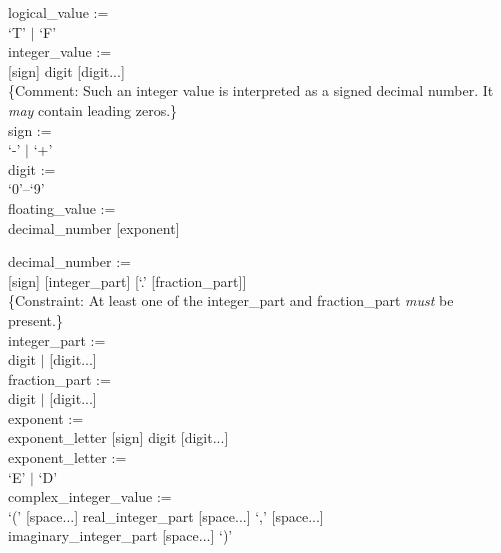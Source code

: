 \documentclass[onecolumn]{aa}
\begin{document}
logical\_value :=   \\ \null \hspace{0.5in}
	`T' $|$ `F' \\

integer\_value :=   \\ \null \hspace{0.5in}
	[sign] digit [digit...] \\
\{Comment: Such an integer value is interpreted as a signed decimal
number.  It {\em may} contain leading zeros.\} \\

sign :=   \\ \null \hspace{0.5in}
	`-' $|$ `+' \\

digit :=   \\ \null \hspace{0.5in}
	`0'--`9' \\

floating\_value :=   \\ \null \hspace{0.5in}
	decimal\_number [exponent]

decimal\_number :=   \\ \null \hspace{0.5in}
	[sign] [integer\_part] [`.' [fraction\_part]]  \\
\{Constraint: At least one of the integer\_part and fraction\_part {\em must} be
present.\} \\

integer\_part :=   \\ \null \hspace{0.5in}
	digit $|$ [digit...] \\

fraction\_part :=   \\ \null \hspace{0.5in}
	digit $|$ [digit...] \\

exponent :=   \\ \null \hspace{0.5in}
	exponent\_letter [sign] digit [digit...] \\

exponent\_letter :=   \\ \null \hspace{0.5in}
	`E' $|$ `D' \\

complex\_integer\_value :=   \\ \null \hspace{0.5in}
	`(' [space...] real\_integer\_part [space...] `,' 
	[space...]    \\ \null \hspace{0.5in}
	imaginary\_integer\_part [space...] `)' \\
\end{document}
